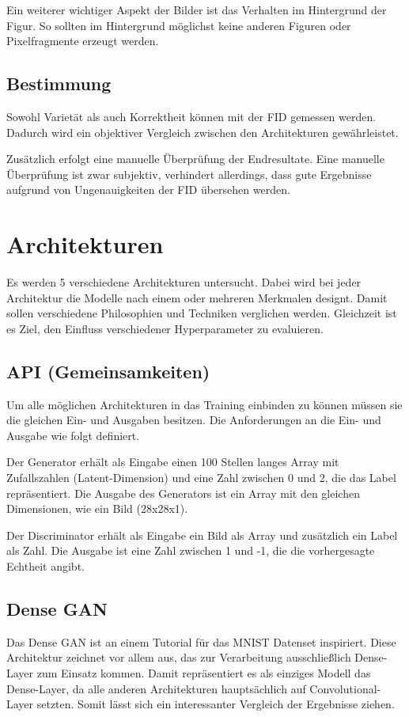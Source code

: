 Ein weiterer wichtiger Aspekt der Bilder ist das Verhalten im Hintergrund der Figur.
So sollten im Hintergrund möglichst keine anderen Figuren oder Pixelfragmente erzeugt werden.

\subsection{Bestimmung}
Sowohl Varietät als auch Korrektheit können mit der \acrlong{FID} \cite{frechet-inception-distance} gemessen werden.
Dadurch wird ein objektiver Vergleich zwischen den Architekturen gewährleistet.
\newline

Zusätzlich erfolgt eine manuelle Überprüfung der Endresultate.
Eine manuelle Überprüfung ist zwar subjektiv, verhindert allerdings, dass gute Ergebnisse aufgrund von Ungenauigkeiten der \acrshort{FID} übersehen werden.

\section{Architekturen}
Es werden 5 verschiedene Architekturen untersucht.
Dabei wird bei jeder Architektur die Modelle nach einem oder mehreren Merkmalen designt.
Damit sollen verschiedene Philosophien und Techniken verglichen werden.
Gleichzeit ist es Ziel, den Einfluss verschiedener Hyperparameter zu evaluieren.

\subsection{API (Gemeinsamkeiten)}
Um alle möglichen Architekturen in das Training einbinden zu können müssen sie die gleichen Ein- und Ausgaben besitzen.
Die Anforderungen an die Ein- und Ausgabe wie folgt definiert.
\newline

Der Generator erhält als Eingabe einen 100 Stellen langes Array mit Zufallszahlen (Latent-Dimension) und eine Zahl zwischen 0 und 2, die das Label repräsentiert.
Die Ausgabe des Generators ist ein Array mit den gleichen Dimensionen, wie ein Bild (28x28x1).
\newline

Der Discriminator erhält als Eingabe ein Bild als Array und zusätzlich ein Label als Zahl.
Die Ausgabe ist eine Zahl zwischen 1 und -1, die die vorhergesagte Echtheit angibt.

\subsection{Dense GAN}
\label{section:dense-gan}
Das Dense GAN ist an einem Tutorial für das MNIST Datenset inspiriert.
Diese Architektur zeichnet vor allem aus, das zur Verarbeitung ausschließlich Dense-Layer zum Einsatz kommen.
Damit repräsentiert es als einziges Modell das Dense-Layer, da alle anderen Architekturen hauptsächlich auf Convolutional-Layer setzten.
Somit lässt sich ein interessanter Vergleich der Ergebnisse ziehen.

